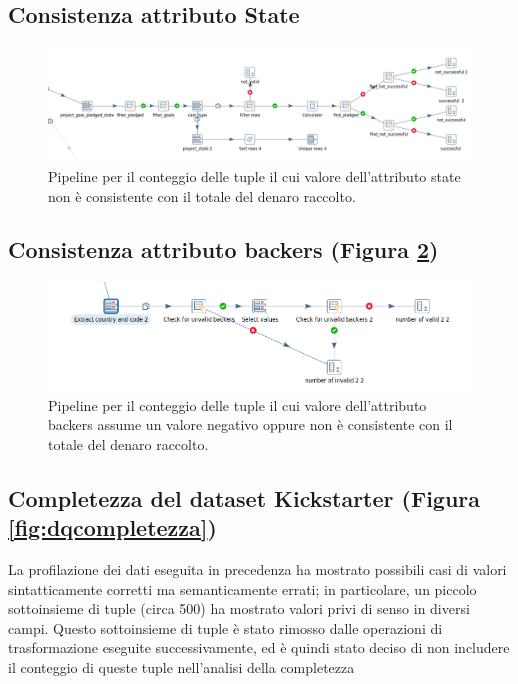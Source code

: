 \subsection{Consistenza attributo State}

\begin{figure}[h!]
	\centering
	\includegraphics[width=0.7\linewidth]{images/DQ_stateaconsistency}
	\caption{Pipeline per il conteggio delle tuple il cui valore dell'attributo state non è consistente con il totale del denaro raccolto.}
	\label{fig:dqstateaconsistency}
\end{figure}


\subsection{Consistenza attributo backers (Figura \ref{fig:dqbackersconsistency})}

\begin{figure}[h!]
	\centering
	\includegraphics[width=0.7\linewidth]{images/DQ_backersconsistency}
	\caption{Pipeline per il conteggio delle tuple il cui valore dell'attributo backers assume un valore negativo oppure non è consistente con il totale del denaro raccolto.}
	\label{fig:dqbackersconsistency}
\end{figure}


\subsection{Completezza del dataset Kickstarter (Figura \ref{fig:dqcompletezza})}
La profilazione dei dati eseguita in precedenza ha mostrato possibili casi di valori sintatticamente corretti ma semanticamente errati; in particolare, un piccolo sottoinsieme di tuple (circa 500) ha mostrato valori privi di senso in diversi campi. Questo sottoinsieme di tuple è stato rimosso dalle operazioni di trasformazione eseguite successivamente, ed è quindi stato deciso di non includere il conteggio di queste tuple nell'analisi della completezza

